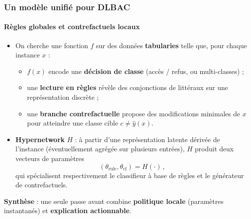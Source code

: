 \documentclass{beamer}
\begin{document}
\begin{frame}
\frametitle{Un modèle unifié pour DLBAC}
\framesubtitle{Règles globales et contrefactuels locaux}

\begin{itemize}
    \item On cherche une fonction $f$ sur des données \textbf{tabularies} telle que, pour chaque instance $x$ :
    \begin{itemize}
        \item $f(x)$ encode une \textbf{décision de classe} (accès / refus, ou multi-classes) ;
        \item une \textbf{lecture en règles} révèle des conjonctions de littéraux sur une représentation discrète ;
        \item une \textbf{branche contrefactuelle} propose des modifications minimales de $x$ pour atteindre une classe cible $c \neq \hat{y}(x)$.
    \end{itemize}
    \item \textbf{Hypernetwork} $H$ : à partir d'une représentation latente dérivée de l'instance (éventuellement agrégée sur plusieurs entrées), $H$ produit deux vecteurs de paramètres
    \[
    (\theta_{\text{rule}}, \theta_{\text{cf}}) = H(\cdot)\,,
    \]
    qui spécialisent respectivement le classifieur à base de règles et le générateur de contrefactuels.
\end{itemize}

\begin{center}
\textbf{Synthèse} : une seule passe avant combine \textbf{politique locale} (paramètres instantanés) et \textbf{explication actionnable}.
\end{center}

\end{frame}
\end{document}
